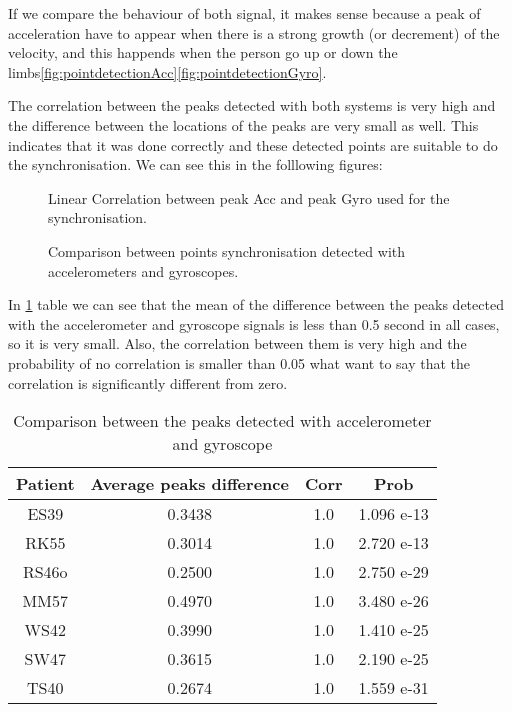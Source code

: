 If we compare the behaviour of both signal, it makes sense because a peak of acceleration have to appear when there is a strong growth (or decrement) of the velocity, and this happends when the person go up or down the limbs\ref{fig:pointdetectionAcc}\ref{fig:pointdetectionGyro}.

The correlation between the peaks detected with both systems is very high and the difference between the locations of the peaks are very small as well. This indicates that it was done correctly and these detected points are suitable to do the synchronisation. We can see this in the folllowing figures:

\begin{figure}[H]
	\centering
	\caption{Linear Correlation between peak Acc and peak Gyro used for the synchronisation.}
	\label{fig:corrAccGyroPoints}
\end{figure}

\begin{figure}[H]
	\centering
	\caption{Comparison between points synchronisation detected with accelerometers and gyroscopes.}
	\label{fig:barDiagram}
\end{figure}


In \ref{tab:comparationAccGyro} table we can see that the mean of the difference between the peaks detected with the accelerometer and gyroscope signals is less than 0.5 second in all cases, so it is very small. Also, the correlation between them is very high and the probability of no correlation is smaller than 0.05 what want to say that the correlation is significantly different from zero.

\begin{table}[h]
	\caption{Comparison between the peaks detected with accelerometer and gyroscope}	
	\centering
	\begin{tabular}{|c|c|c|c|}\hline
		
		Patient 				& Average peaks difference 	& Corr 	& Prob 	\\ \hline
		ES39 & 0.3438			& 1.0									& 1.096 e-13					\\
		RK55	& 0.3014			& 1.0									& 2.720 e-13				\\
		RS46o & 0.2500			& 1.0									& 2.750  e-29					\\
		MM57	& 0.4970			& 1.0									& 3.480 e-26					\\
		WS42  & 0.3990			& 1.0									& 1.410 e-25					\\
		SW47	& 0.3615			& 1.0									& 2.190 e-25					\\
		TS40  & 0.2674			& 1.0									& 1.559 e-31				\\ \hline
	\end{tabular}
	\label{tab:comparationAccGyro}
	
\end{table}

